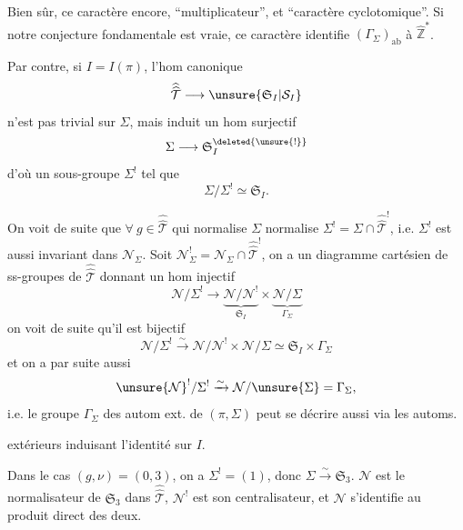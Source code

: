 
Bien sûr, ce caractère  encore, ``multiplicateur'', et ``caractère cyclotomique''.  Si notre conjecture fondamentale est vraie, ce caractère identifie $(\Gamma_\Sigma)_{\mathrm{ab}}$ à $\widehat{\mathbb Z}^{*}$.

Par contre, si $I=I(\pi)$, l'hom canonique
\[
\widehat{\widehat{\mathcal T}}\longrightarrow\unsure{\mathfrak S_I|\mathcal S_I}
\]
n'est  pas trivial sur $\Sigma$, mais induit un hom surjectif
\[
\Sigma\longrightarrow\mathfrak S_I^{\deleted{\unsure{!}}}
\]
d'où un sous-groupe $\Sigma^!$ tel que
\[
\Sigma/\Sigma^!\simeq\mathfrak S_I.
\]

On voit de suite que $\forall\ g\in\widehat{\widehat{\mathcal T}}$ qui normalise $\Sigma$ normalise $\Sigma^!=\Sigma\cap\widehat{\widehat{\mathcal T}}^!$, i.e. $\Sigma^!$ est aussi invariant dans $\mathcal N_\Sigma$.  Soit $\mathcal N_\Sigma^!=\mathcal N_\Sigma\cap\widehat{\widehat{\mathcal T}}^!$, on a un diagramme cartésien de ss-groupes de $\widehat{\widehat{\mathcal T}}$
donnant un hom injectif
\[
\mathcal N/\Sigma^!\longrightarrow
\underbrace{\mathcal N/\mathcal N^!}_{\mathfrak S_I}\times
\underbrace{\mathcal N/\Sigma}_{\Gamma_\Sigma}
\]
 on voit de suite qu'il est bijectif
\[
\mathcal N/\Sigma^!\xrightarrow{\sim}\mathcal N/\mathcal N^!\times\mathcal N/\Sigma\simeq\mathfrak S_I\times\Gamma_\Sigma
\]
et on a par suite aussi
\[
\unsure{\mathcal N}^!/\Sigma^!\xrightarrow{\sim}\mathcal N/\unsure{\Sigma}=\Gamma_\Sigma,
\]
i.e. le groupe $\Gamma_\Sigma$ des autom  ext. de $(\pi,\Sigma)$ peut se décrire aussi via les automs.


extérieurs induisant l'identité sur $I$.

Dans le cas $(g,\nu)=(0,3)$, on a $\Sigma^!=(1)$, \unsure{$\Rightarrow$} donc $\Sigma\xrightarrow{\sim}\mathfrak S_3$. $\mathcal N$ est le  normalisateur de $\mathfrak S_3$ dans $\widehat{\widehat{\mathcal T}}$, $\mathcal N^!$ \inserted{$\unsure{\xrightarrow{\sim}}\Gamma_\Sigma$} est son centralisateur, et $\mathcal N$ s'identifie au produit direct des deux.

